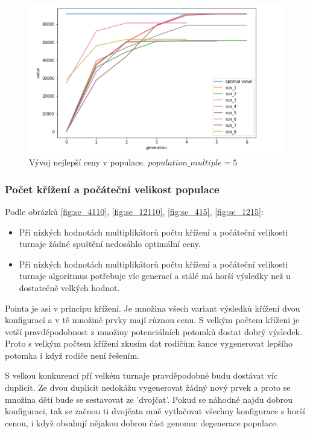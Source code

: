 \documentclass{article}
\begin{document}
\begin{figure}[H]
    \centering
    \includegraphics[width=1\textwidth]{screenshot_1285}
    \caption{Vývoj nejlepší ceny v populace. \(population\_multiple = 5\)}
    \label{fig:se_pm5}
\end{figure}
\newpage

\subsubsection{Počet křížení a počáteční velikost populace}

Podle obrázků \ref{fig:se_4110}, \ref{fig:se_12110}, \ref{fig:se_415}, \ref{fig:se_1215}:
\begin{itemize}
\item Pří nízkých hodnotách multiplikátorů počtu křížení a počáteční velikosti turnaje žádné spuštění nedosáhlo optimální ceny.
\item Pří nízkých hodnotách multiplikátorů počtu křížení a počáteční velikosti turnaje algoritmus potřebuje víc generací a stálé má horší výsledky než u dostatečně velkých hodnot.
\end{itemize}

Pointa je asi v principu křížení. Je množina všech variant výsledků křížení dvou konfigurací a v tě množině prvky mají různou cenu. S velkým počtem kříženi je vetší pravděpodobnost z množiny potenciálních potomků dostat dobrý výsledek. Proto s velkým počtem křížení zkusím dat rodičům šance vygenerovat lepšího potomka i když rodiče není řešením.

S velkou konkurencí pří velkém turnaje pravděpodobné budu dostávat víc duplicit. Ze dvou duplicit nedokážu vygenerovat žádný nový prvek a proto se množina dětí bude se sestavovat ze 'dvojčat'. Pokud se náhodné najdu dobrou konfiguraci, tak se začnou ti dvojčata mně vytlačovat všechny konfigurace s horší cenou, i když obsahují nějakou dobrou část genomu: degenerace populace.\\
\end{document}
